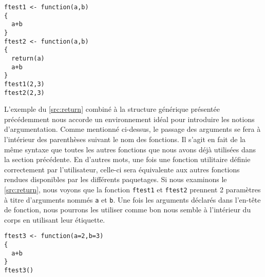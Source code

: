 \begin{lstlisting}[caption = L'instruction \texttt{return} et le retour standard d'une fonction R ,label=src:return]
ftest1 <- function(a,b)
{
  a+b
}
ftest2 <- function(a,b)
{
  return(a)
  a+b
}
ftest1(2,3)
ftest2(2,3)
\end{lstlisting}

\vspace{\baselineskip}
L'exemple du \autoref{src:return} combiné à la structure générique présentée précédemment nous accorde un environnement idéal pour introduire les notions d'argumentation. Comme mentionné ci-dessus, le passage des arguments se fera à l'intérieur des parenthèses suivant le nom des fonctions. Il s'agit en fait de la même syntaxe que toutes les autres fonctions que nous avons déjà utilisées dans la section précédente. En d'autres mots, une fois une fonction utilitaire définie correctement par l'utilisateur, celle-ci sera équivalente aux autres fonctions rendues disponibles par les différents paquetages. Si nous examinons le \autoref{src:return}, nous voyons que la fonction \texttt{ftest1} et \texttt{ftest2} prennent 2 paramètres à titre d'arguments nommés \texttt{a} et \texttt{b}. Une fois les arguments déclarés dans l'en-tête de fonction, nous pourrons les utiliser comme bon nous semble à l'intérieur du corps en utilisant leur étiquette.

\begin{lstlisting}[caption = Définir des valeurs par défauts dans les fonctions utilitaires,label=src:defaultParams]
ftest3 <- function(a=2,b=3)
{
  a+b
}
ftest3()
\end{lstlisting}

